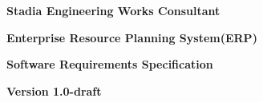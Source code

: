 \begin{titlepage}
\begin{center}
		\begin{LARGE}
			\bf{Stadia Engineering Works Consultant}
		\end{LARGE}
		\vspace*{30pt}
		
		{\large \textbf{Enterprise Resource Planning System(ERP)}}
		\vspace{1.5\baselineskip}
		
		{\large \textbf{Software Requirements Specification}}
		\vspace{1.5\baselineskip}	
		
		{\large \textbf{Version 1.0-draft}}
		\vspace{3.5\baselineskip}
		
		
		\vspace{15pt}
	
	\end{center}
\end{titlepage}